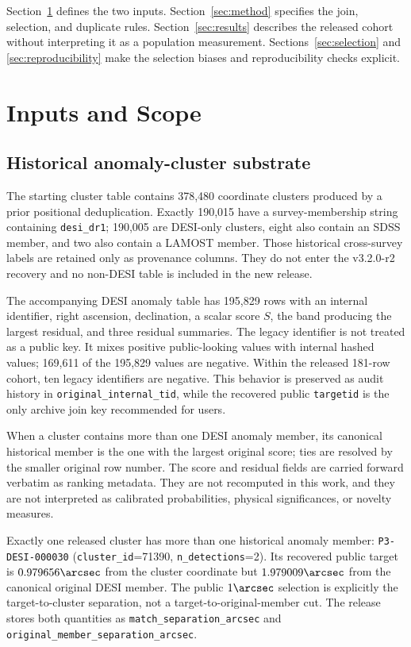 \documentclass[twocolumn]{aastex701}
\newcommand{\releaseVersion}{v3.2.0-r2}
\begin{document}
Section~\ref{sec:data} defines the two inputs.  Section~\ref{sec:method} specifies the join,
selection, and duplicate rules.  Section~\ref{sec:results} describes the released cohort without
interpreting it as a population measurement.  Sections~\ref{sec:selection} and
\ref{sec:reproducibility} make the selection biases and reproducibility checks explicit.

\section{Inputs and Scope}\label{sec:data}

\subsection{Historical anomaly-cluster substrate}\label{sec:anomaly-input}

The starting cluster table contains 378,480 coordinate clusters produced by a prior positional
deduplication.  Exactly 190,015 have a survey-membership string containing \texttt{desi\_dr1};
190,005 are DESI-only clusters, eight also contain an SDSS member, and two also contain a LAMOST
member.  Those historical cross-survey labels are retained only as provenance columns.  They do
not enter the \releaseVersion{} recovery and no non-DESI table is included in the new release.

The accompanying DESI anomaly table has 195,829 rows with an internal identifier, right
ascension, declination, a scalar score $S$, the band producing the largest residual, and three
residual summaries.  The legacy identifier is not treated as a public key.  It mixes positive
public-looking values with internal hashed values; 169,611 of the 195,829 values are negative.
Within the released 181-row cohort, ten legacy identifiers are negative.  This behavior is
preserved as audit history in \texttt{original\_internal\_tid}, while the recovered public
\texttt{targetid} is the only archive join key recommended for users.

When a cluster contains more than one DESI anomaly member, its canonical historical member is
the one with the largest original score; ties are resolved by the smaller original row number.
The score and residual fields are carried forward verbatim as ranking metadata.  They are not
recomputed in this work, and they are not interpreted as calibrated probabilities, physical
significances, or novelty measures.

Exactly one released cluster has more than one historical anomaly member:
\texttt{P3-DESI-000030} (\texttt{cluster\_id}=71390, \texttt{n\_detections}=2).  Its recovered
public target is $0.979656\arcsec$ from the cluster coordinate but $1.979009\arcsec$ from the
canonical original DESI member.  The public $1\arcsec$ selection is explicitly the target-to-cluster
separation, not a target-to-original-member cut.  The release stores both quantities as
\texttt{match\_separation\_arcsec} and \texttt{original\_member\_separation\_arcsec}.
\end{document}
